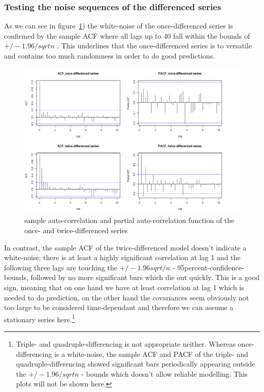 \documentclass[11pt,a4paper]{article}
\begin{document}
\subsubsection{Testing the noise sequences of the differenced series}
As we can see in figure~\ref{fig:diff12_acf_pacf}) the white-noise of the once-differenced series is confirmed by the sample ACF where all lags up to 40 fall within the bounds of $+/-1.96/sqrt{n}$ \cite[p.~39]{bd02}. This underlines that the once-differenced series is to versatile and contains too much randomness in order to do good predictions.\\
\begin{figure}[!htb]
\centering
\includegraphics[angle=0,
width=1\textwidth]{diff12_acf_pacf}
\caption{sample auto-correlation and partial auto-correlation function of the once- and twice-differenced series
\label{fig:diff12_acf_pacf}}
\end{figure}
In contrast, the sample ACF of the twice-differenced model doesn't indicate a white-noise: there is at least a highly significant correlation at lag 1 and the following three lags are touching the $+/-1.96sqrt/{n}$ - 95percent-confidence-bounds, followed by no more significant bars which die out quickly. This is a good sign, meaning that on one hand we have at least correlation at lag 1 which is needed to do prediction, on the other hand the covariances seem obviously not too large to be considered time-dependant and therefore we can assume a stationary series here.\footnote{Triple- and quadruple-differencing is not appropriate neither. Whereas once-differencing is a white-noise, the sample ACF and PACF of the triple- and quadruple-differencing showed significant bars periodically appearing outside the $+/-1.96/sqrt{n}$ - bounds which doesn't allow reliable modelling. This plots will not be shown here.}\\
\end{document}
